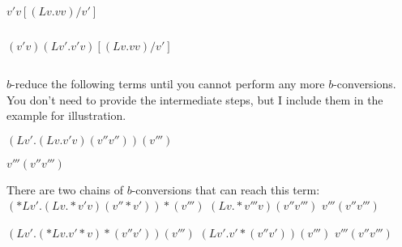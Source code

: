 	\answer
	$ $
	\endanswer

$ v'v[(Lv.vv)/v'] $

	\answer
	$ $
	\endanswer

$ (v'v)(Lv'.v'v)[(Lv.vv)/v'] $

	\answer
	$ $
	\endanswer

\endproblems


\pagebreak


$ b$-reduce the following terms until you cannot perform any more $ b$-conversions. You don't need to provide the intermediate steps, but I include them in the example for illustration.

\problems
{}
$ (Lv'.(Lv.v'v)(v''v''))(v''') $

	\answer
	$ v'''(v''v''') $
	\endanswer

\bigskip
There are two chains of $ b$-conversions that can reach this term:\medskip
$ (*{Lv'.}(Lv.*v'v)(v''*v'))*{(v''')} $  \cvs  $ (Lv.*{v'''}v)(v''v''') $  \cvs  $ v'''(v''v''') $

$ (Lv'.(*{Lv.}v'*v)*{(v''v')})(v''') $  \cvs  $ (Lv'.v'*{(v''v')})(v''') $  \cvs  $ v'''(v''v''') $

\endproblems
\bye
